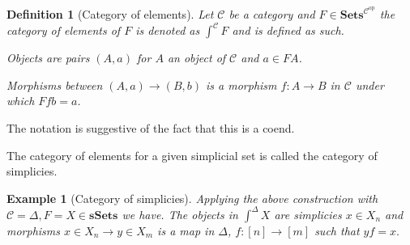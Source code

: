 \documentclass[12pt]{report}
\numberwithin{equation}{section}
\newtheorem{definition}[dummy]{Definition}
\newtheorem{example}[dummy]{Example}
\begin{document}
%				
%				
%			
%	
%		
%			
	
	\begin{definition}[Category of elements]
		Let $\mathcal{C}$ be a category and $F\in \mathbf{Sets}^{\mathcal{C}^{\mathrm{op}}}$ the category of elements of $F$ is denoted as $\int^{\mathcal{C}} F $ and is defined as such.
		
		Objects are pairs $(A,a)$ for $A$ an object of $\mathcal{C}$ and $a \in FA$.
		
		Morphisms between $(A,a) \to (B,b)$ is a morphism $f:A\to B$ in $\mathcal{C}$ under which $Ffb=a$.
	\end{definition}
	The notation is suggestive of the fact that this is a coend.
	
	The category of elements for a given simplicial set is called the category of simplicies.
	\begin{example}[Category of simplicies]
		Applying the above construction with $\mathcal{C}=\Delta, F=X \in \mathbf{sSets}$ we have. The objects in $\int^\Delta X$ are simplicies $x \in X_n$ and morphisms $x\in X_n \to y\in X_m$ is a map in $\Delta$, $f:[n]\to [m] $ such that $yf=x.$
	\end{example}
	
\end{document}
